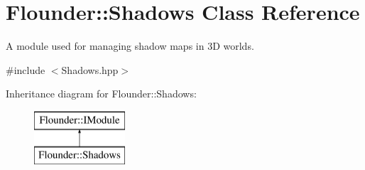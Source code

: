 \hypertarget{class_flounder_1_1_shadows}{}\section{Flounder\+:\+:Shadows Class Reference}
\label{class_flounder_1_1_shadows}


A module used for managing shadow maps in 3D worlds.  




{\ttfamily \#include $<$Shadows.\+hpp$>$}

Inheritance diagram for Flounder\+:\+:Shadows\+:\begin{figure}[H]
\begin{center}
\leavevmode
\includegraphics[height=2.000000cm]{class_flounder_1_1_shadows}
\end{center}
\end{figure}

